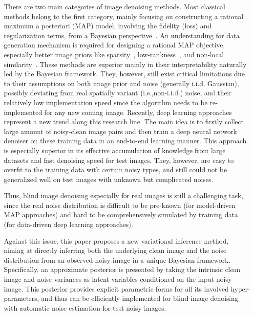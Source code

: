 \documentclass{article}
\begin{document}
There are two main categories of image denoising methods. Most classical methods belong to the first category, mainly focusing on constructing a rational maximum a posteriori (MAP) model, involving
the fidelity (loss) and regularization terms, from a Bayesian perspective~\cite{bishop2006pattern}.
An understanding for data generation mechanism is required for designing a rational MAP objective, especially
better image priors like sparsity~\cite{aharon2006k},
low-rankness~\cite{gu2014weighted,zhu2016noise,Xu_2018_ECCV}, and non-local
similarity~\cite{buades2005non,maggioni2013nonlocal}.
These methods are superior mainly in their interpretability naturally led by the Bayesian framework.
They, however, still exist critical limitations due to their assumptions on both
image prior and noise (generally i.i.d. Gaussian), possibly deviating from real
spatially variant (i.e.,non-i.i.d.) noise,
and their relatively low implementation speed
since the algorithm needs to be re-implemented for any
new coming image. Recently, deep learning approaches represent a new trend along this research line.
The main idea is to firstly collect large amount of noisy-clean image pairs
and then train a deep neural network denoiser
on these training data in an end-to-end learning manner. This approach is
especially superior in its effective accumulation of knowledge from large datasets and
fast denoising speed for test images.
They, however,  are easy to overfit
to the training data with certain noisy types, and still could not be generalized well on test
images with unknown but complicated noises.

Thus, blind image denoising especially for real images is still a challenging task, since the real noise
distribution is difficult to be pre-known (for model-driven MAP approaches)
and hard to be comprehensively simulated by training data (for data-driven deep learning approaches).

Against this issue, this paper proposes a new variational inference method, aiming at directly inferring both
the underlying clean image and the noise distribution from an observed noisy image in a unique Bayesian framework.
Specifically, an approximate posterior is presented by taking the intrinsic clean image and noise variances as
latent variables conditioned on the input noisy image. This posterior provides explicit parametric forms for all
its involved hyper-parameters, and thus can be efficiently implemented for blind image denoising with automatic
noise estimation for test noisy images.
\end{document}
